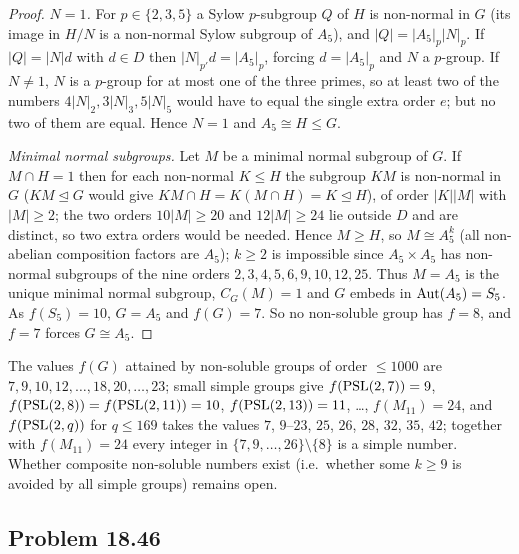 \begin{proof}
\emph{$N=1$.} For $p\in\{2,3,5\}$ a Sylow $p$-subgroup $Q$ of $H$ is non-normal in $G$ (its image in $H/N$ is a
non-normal Sylow subgroup of $A_5$), and $|Q|=|A_5|_p|N|_p$. If $|Q|=|N|d$ with $d\in D$ then $|N|_{p'}d=|A_5|_p$,
forcing $d=|A_5|_p$ and $N$ a $p$-group. If $N\ne 1$, $N$ is a $p$-group for at most one of the three primes, so
at least two of the numbers $4|N|_2,3|N|_3,5|N|_5$ would have to equal the single extra order $e$; but no two of
them are equal. Hence $N=1$ and $A_5\cong H\le G$.

\emph{Minimal normal subgroups.} Let $M$ be a minimal normal subgroup of $G$. If $M\cap H=1$ then for each
non-normal $K\le H$ the subgroup $KM$ is non-normal in $G$ ($KM\trianglelefteq G$ would give
$KM\cap H=K(M\cap H)=K\trianglelefteq H$), of order $|K||M|$ with $|M|\ge 2$; the two orders $10|M|\ge 20$ and
$12|M|\ge 24$ lie outside $D$ and are distinct, so two extra orders would be needed. Hence $M\ge H$, so
$M\cong A_5^k$ (all non-abelian composition factors are $A_5$); $k\ge 2$ is impossible since $A_5\times A_5$ has
non-normal subgroups of the nine orders $2,3,4,5,6,9,10,12,25$. Thus $M=A_5$ is the unique minimal normal
subgroup, $C_G(M)=1$ and $G$ embeds in $\operatorname{Aut}(A_5)=S_5$. As $f(S_5)=10$, $G=A_5$ and $f(G)=7$. So no non-soluble
group has $f=8$, and $f=7$ forces $G\cong A_5$.
\end{proof}

\begin{remark}
The values $f(G)$ attained by non-soluble groups of order $\le 1000$ are $7,9,10,12,\dots,18,20,\dots,23$; small simple
groups give $f(\mathrm{PSL}(2,7))=9$, $f(\mathrm{PSL}(2,8))=f(\mathrm{PSL}(2,11))=10$, $f(\mathrm{PSL}(2,13))=11$, \dots, $f(M_{11})=24$, and
$f(\mathrm{PSL}(2,q))$ for $q\le 169$ takes the values $7$, $9$--$23$, $25$, $26$, $28$, $32$, $35$, $42$; together with
$f(M_{11})=24$ every integer in $\{7,9,\dots,26\}\setminus\{8\}$ is a simple number. Whether composite
non-soluble numbers exist (i.e.\ whether some $k\ge 9$ is avoided by all simple groups) remains open.
\end{remark}

\subsection{Problem 18.46}\label{app:1846}


